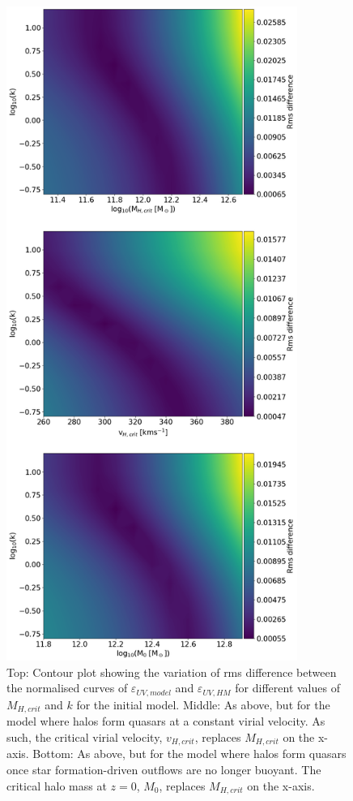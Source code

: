 \documentclass[12pt, twocolumn]{report}%
\begin{document}
\begin{figure}[H]
\centering
\includegraphics[width=9.5cm]{Contour_1.png}
\caption{Top: Contour plot showing the variation of rms difference between the normalised curves of $\varepsilon_{UV,model}$ and $\varepsilon_{UV,HM}$ for different values of $M_{H,crit}$ and $k$ for the initial model. Middle: As above, but for the model where halos form quasars at a constant virial velocity. As such, the critical virial velocity, $v_{H,crit}$, replaces $M_{H,crit}$ on the x-axis. Bottom: As above, but for the model where halos form quasars once star formation-driven outflows are no longer buoyant. The critical halo mass at $z=0$, $M_0$, replaces $M_{H,crit}$ on the x-axis.}
\label{fig:12}
\end{figure}
\clearpage
\twocolumngrid
\end{document}
